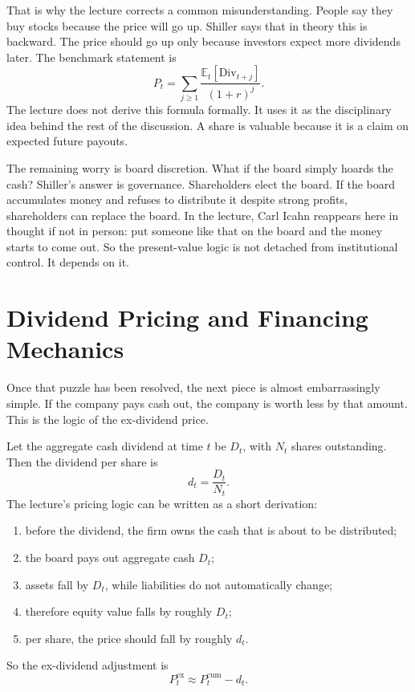 That is why the lecture corrects a common misunderstanding. People say they buy stocks because the price will go up. Shiller says that in theory this is backward. The price should go up only because investors expect more dividends later. The benchmark statement is
\begin{equation}
P_t = \sum_{j \ge 1}\frac{\mathbb{E}_t[\mathrm{Div}_{t+j}]}{(1+r)^j}.
\end{equation}
The lecture does not derive this formula formally. It uses it as the disciplinary idea behind the rest of the discussion. A share is valuable because it is a claim on expected future payouts.

The remaining worry is board discretion. What if the board simply hoards the cash? Shiller's answer is governance. Shareholders elect the board. If the board accumulates money and refuses to distribute it despite strong profits, shareholders can replace the board. In the lecture, Carl Icahn reappears here in thought if not in person: put someone like that on the board and the money starts to come out. So the present-value logic is not detached from institutional control. It depends on it.

\section{Dividend Pricing and Financing Mechanics}

Once that puzzle has been resolved, the next piece is almost embarrassingly simple. If the company pays cash out, the company is worth less by that amount. This is the logic of the ex-dividend price.

Let the aggregate cash dividend at time $t$ be $D_t$, with $N_t$ shares outstanding. Then the dividend per share is
\begin{equation}
d_t = \frac{D_t}{N_t}.
\end{equation}
The lecture's pricing logic can be written as a short derivation:
\begin{enumerate}
\item before the dividend, the firm owns the cash that is about to be distributed;
\item the board pays out aggregate cash $D_t$;
\item assets fall by $D_t$, while liabilities do not automatically change;
\item therefore equity value falls by roughly $D_t$;
\item per share, the price should fall by roughly $d_t$.
\end{enumerate}
So the ex-dividend adjustment is
\begin{equation}
P_t^{\mathrm{ex}} \approx P_t^{\mathrm{cum}} - d_t.
\end{equation}

